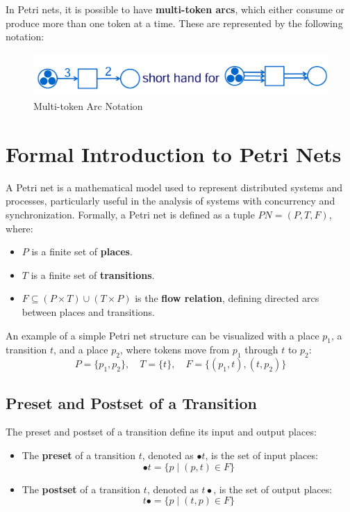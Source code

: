     In Petri nets, it is possible to have \textbf{multi-token arcs}, which either consume or produce more than one token at a time. These are represented by the following notation:
    
    \begin{figure}[h]
        \centering
        \includegraphics[scale=0.3]{capitolo 3/3-multiplearcs.png}
        \caption{Multi-token Arc Notation}
    \end{figure}
    
    \section{Formal Introduction to Petri Nets}
    
    
    A Petri net is a mathematical model used to represent distributed systems and processes, particularly useful in the analysis of systems with concurrency and synchronization. Formally, a Petri net is defined as a tuple \(PN = (P, T, F)\), where:
    
    \begin{itemize}
        \item \(P\) is a finite set of \textbf{places}.
        \item \(T\) is a finite set of \textbf{transitions}.
        \item \(F \subseteq (P \times T) \cup (T \times P)\) is the \textbf{flow relation}, defining directed arcs between places and transitions.
    \end{itemize}
    
    An example of a simple Petri net structure can be visualized with a place \(p_1\), a transition \(t\), and a place \(p_2\), where tokens move from \(p_1\) through \(t\) to \(p_2\):
    \[
    P = \{p_1, p_2\}, \quad T = \{t\}, \quad F = \{(p_1, t), (t, p_2)\}
    \]
    
    \subsection{Preset and Postset of a Transition}
    
    The preset and postset of a transition define its input and output places:
    \begin{itemize}
        \item The \textbf{preset} of a transition \(t\), denoted as \(\bullet t\), is the set of input places: 
        \[
        \bullet t = \{ p \mid (p, t) \in F \}
        \]
        \item The \textbf{postset} of a transition \(t\), denoted as \(t \bullet\), is the set of output places: 
        \[
        t \bullet = \{ p \mid (t, p) \in F \}
        \]
    \end{itemize}
    
